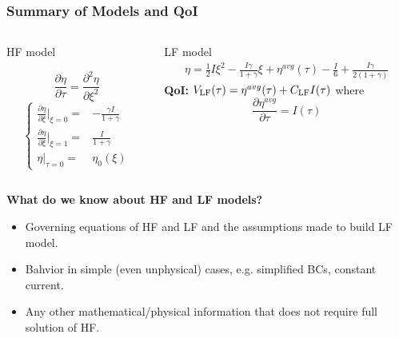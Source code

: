 \documentclass[10pt,xcolor=dvipsnames,compress]{beamer}
\begin{document}
\begin{frame}
\frametitle{Summary of Models and QoI}
\vfill

\begin{columns}
\begin{column}{.35\textwidth} 
\begin{problock}{HF model}

\begin{equation*}\label{eq:HF}
\frac{\partial\eta}{\partial\tau} = \frac{\partial^2\eta}{\partial\xi^2}
\end{equation*}
\begin{equation*}
\left\{\begin{matrix}
\frac{\partial\eta}{\partial\xi}|_{\xi=0} = & -\frac{\gamma I}{1+\gamma}\\
\frac{\partial\eta}{\partial\xi}|_{\xi=1} = & \frac{I}{1+\gamma} \nonumber\\
\eta|_{\tau=0} 	 =  & \eta_0(\xi)
\end{matrix}\right.
\end{equation*}

\end{problock}
\end{column}
\begin{column}{.6\textwidth}
\begin{block}{LF model}
\begin{eqnarray*}
\eta = 
\frac{1}{2}I\xi^2 - \frac{I \gamma}{1+\gamma}\xi +
{\eta}^{avg}(\tau) - \frac{I}{6} + \frac{I\gamma}{2(1+\gamma)}
\end{eqnarray*}
%
\textbf{QoI:}
$
V_{\rm LF}(\tau) = {\eta}^{avg}(\tau) + C_{\rm LF} I(\tau)
$
where
\begin{equation*}
\frac{\partial{\eta}^{avg}}{\partial\tau} = I(\tau)
\end{equation*}
\end{block}

\end{column}
\end{columns}


\begin{center}
\textbf{What do we know about HF and LF models?}
\end{center}

\begin{itemize}
\item Governing equations of HF and LF and the assumptions made to build LF model.
\item Bahvior in simple (even unphysical) cases, e.g. simplified BCs, constant current. 
\item Any other mathematical/physical information that does not require full solution of HF.


\end{itemize}



\vfill
\end{frame}
\end{document}
